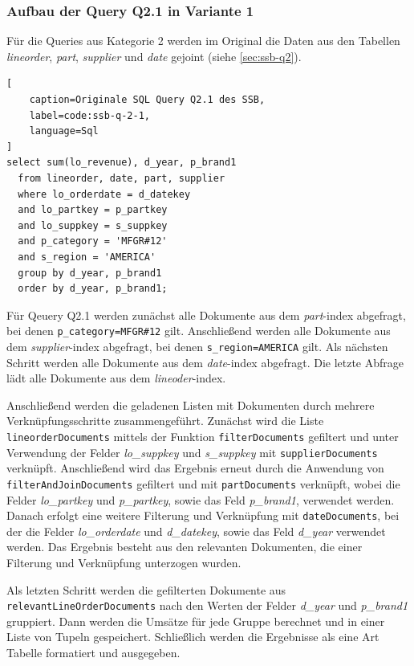 

\subsubsection{Aufbau der Query Q2.1 in Variante 1}
Für die Queries aus Kategorie 2 werden im Original die Daten aus den Tabellen \emph{lineorder}, \emph{part}, \emph{supplier} und \emph{date} gejoint (siehe \cref{sec:ssb-q2}).

\begin{lstlisting}[
    caption=Originale SQL Query Q2.1 des SSB,
    label=code:ssb-q-2-1,
    language=Sql
]
select sum(lo_revenue), d_year, p_brand1
  from lineorder, date, part, supplier
  where lo_orderdate = d_datekey
  and lo_partkey = p_partkey
  and lo_suppkey = s_suppkey
  and p_category = 'MFGR#12'
  and s_region = 'AMERICA'
  group by d_year, p_brand1
  order by d_year, p_brand1;
\end{lstlisting}


Für Qeuery Q2.1 werden zunächst alle Dokumente aus dem \emph{part}-index abgefragt, bei denen \lstinline|p_category=MFGR#12| gilt.
Anschließend werden alle Dokumente aus dem \emph{supplier}-index abgefragt, bei denen \lstinline|s_region=AMERICA| gilt.
Als nächsten Schritt werden alle Dokumente aus dem \emph{date}-index abgefragt. Die letzte Abfrage lädt alle Dokumente aus dem \emph{lineoder}-index.

Anschließend werden die geladenen Listen mit Dokumenten durch mehrere Verknüpfungsschritte zusammengeführt.
Zunächst wird die Liste \lstinline|lineorderDocuments| mittels der Funktion \lstinline|filterDocuments| gefiltert und unter Verwendung der Felder \emph{lo\_suppkey} und \emph{s\_suppkey} mit \lstinline|supplierDocuments| verknüpft.
Anschließend wird das Ergebnis erneut durch die Anwendung von \lstinline|filterAndJoinDocuments| gefiltert und mit \lstinline|partDocuments| verknüpft, wobei die Felder \emph{lo\_partkey} und \emph{p\_partkey}, sowie das Feld \emph{p\_brand1}, verwendet werden.\\
Danach erfolgt eine weitere Filterung und Verknüpfung mit \lstinline|dateDocuments|, bei der die Felder \emph{lo\_orderdate} und \emph{d\_datekey}, sowie das Feld \emph{d\_year} verwendet werden.
Das Ergebnis besteht aus den relevanten Dokumenten, die einer Filterung und Verknüpfung unterzogen wurden.

Als letzten Schritt werden die gefilterten Dokumente aus \lstinline|relevantLineOrderDocuments| nach den Werten der Felder \emph{d\_year} und \emph{p\_brand1} gruppiert.
Dann werden die Umsätze für jede Gruppe berechnet und in einer Liste von Tupeln gespeichert.
Schließlich werden die Ergebnisse als eine Art Tabelle formatiert und ausgegeben.

